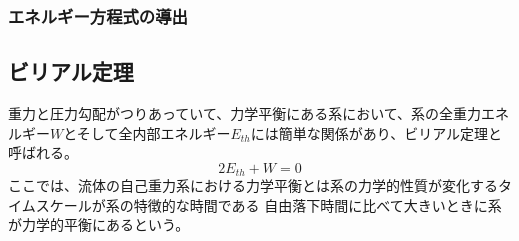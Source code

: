 \documentclass{jsarticle}
\begin{document}
\subsubsection{エネルギー方程式の導出}

\subsection{ビリアル定理}
重力と圧力勾配がつりあっていて、力学平衡にある系において、系の全重力エネルギー$W$とそして全内部エネルギー$E_{th}$には簡単な関係があり、ビリアル定理と呼ばれる。
\begin{equation}
     2E_{th} + W = 0
\end{equation}
ここでは、流体の自己重力系における力学平衡とは系の力学的性質が変化するタイムスケールが系の特徴的な時間である
自由落下時間に比べて大きいときに系が力学的平衡にあるという。
\end{document}
